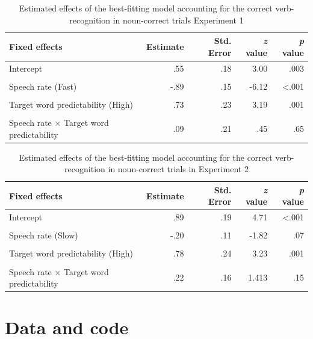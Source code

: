 \documentclass[a4paper, nobind]{templates/ociamthesis}
\begin{document}
\begin{table}[h]
\begin{center}
\caption{Estimated effects of the best-fitting model accounting for the correct verb-recognition in noun-correct trials Experiment 1}
\label{fastcomplementary} 
\vskip 0.12in
\begin{tabular}[]{@{}lrrrr@{}}
\toprule
Fixed effects & Estimate & Std. Error & \emph{z} value & \emph{p}
value \\
\midrule
Intercept & .55 & .18 & 3.00 & .003 \\
\\
Speech rate (Fast) & -.89 & .15 & -6.12 & \textless.001 \\
\\
Target word predictability (High) & .73 & .23 & 3.19 & .001 \\
\\
Speech rate $\times$ Target word predictability & .09 & .21 & .45 & .65 \\
\bottomrule
\end{tabular} 
\end{center} 
\end{table}

\begin{table}[H]
\begin{center}
\caption{Estimated effects of the best-fitting model accounting for the correct verb-recognition in noun-correct trials in Experiment 2}
\label{slowcomplementary} 
\vskip 0.12in
\begin{tabular}[]{@{}lrrrr@{}}
\toprule
Fixed effects & Estimate & Std. Error & \emph{z} value & \emph{p}
value \\
\midrule
Intercept & .89 & .19 & 4.71 & \textless.001 \\
\\
Speech rate (Slow) & -.20 & .11 & -1.82 & .07 \\
\\
Target word predictability (High) & .78 & .24 & 3.23 & .001 \\
\\
Speech rate $\times$ Target word predictability & .22 & .16 & 1.413 & .15 \\
\bottomrule
\end{tabular} 
\end{center} 
\end{table}

\hypertarget{appendix-D}{%
\chapter{Data and code}\label{appendix-D}}
\end{document}
